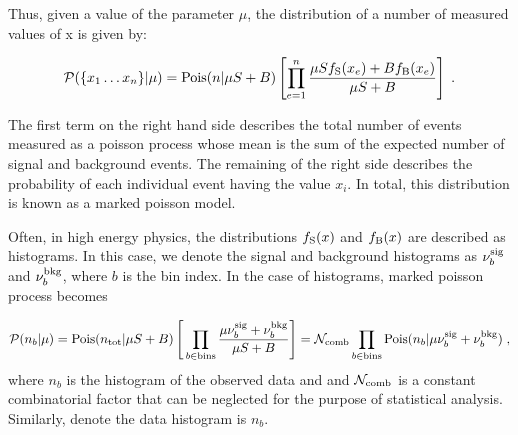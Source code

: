 Thus, given a value of the parameter $\mu$, the distribution of a number of measured values of x is given by:

\begin{eqnarray}
{\cal P}(\{x_1\dots x_n\} | \mu)=  \textrm{Pois}(n | \mu S+B) \left[ \prod_{e=1}^n \frac{\mu S f_{\rm S}(x_e) + B f_{\rm B}(x_e)}{\mu S+B}\right ] \; .
\end{eqnarray}

The first term on the right hand side describes the total number of events measured as a poisson process whose mean is the sum of the expected number of signal and background events.
The remaining of the right side describes the probability of each individual event having the value $x_i$.
In total, this distribution is known as a marked poisson model.

Often, in high energy physics, the distributions $f_{\rm S}(x)$ and $f_{\rm B}(x)$ are described as histograms.
In this case, we denote the signal and background histograms as $\nu_b^{\rm sig}$ and $\nu_b^{\rm bkg}$, where $b$ is the bin index.
In the case of histograms,  marked poisson process becomes

\begin{eqnarray}
{\cal P}(n_b |\mu)=  \textrm{Pois}(n_{\rm tot} | \mu S + B) \left[\, \prod_{b\in\rm bins}\frac{\mu \nu_b^{\rm sig} + \nu_b^{\rm bkg}}{\mu S + B}\right ] = \mathcal{N}_{\rm comb} \prod_{b\in\rm bins} \textrm{Pois}(n_b | \mu \nu_{b}^{\rm sig} + \nu_{b}^{\rm bkg}) \; ,
\end{eqnarray}
where $n_b$ is the histogram of the observed data and and $\mathcal{N}_{\rm comb}$ is a constant combinatorial factor that can be neglected for the purpose of statistical analysis.   
Similarly, denote the data histogram is $n_b$.


